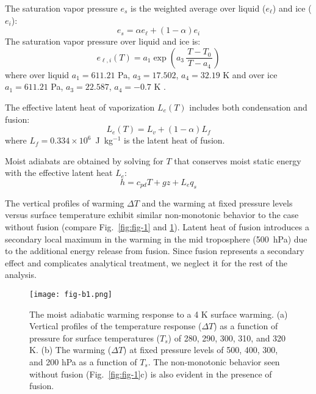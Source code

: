 \documentclass[draft]{ametsocV6.1}
\begin{document}
The saturation vapor pressure $e_s$ is the weighted average over liquid ($e_\ell$) and ice ($e_i$):
\begin{equation}
e_s=\alpha e_{\ell}+(1-\alpha)e_i
\end{equation}
The saturation vapor pressure over liquid and ice is:
\begin{equation}
e_{\ell,i}(T) = a_1 \exp \left( a_3 \,\frac{T - T_0}{\,T - a_4\,} \right)
\label{eq:es_general}
\end{equation}
where over liquid $a_1=611.21$ Pa, $a_3=17.502$, $a_4=32.19$ K \citep{buck1981} and over ice $a_1=611.21$ Pa, $a_3=22.587$, $a_4=-0.7$ K \citep{alduchov1996}.

The effective latent heat of vaporization $L_e(T)$ includes both condensation and fusion:
\begin{equation}
L_e(T) = L_v + (1-\alpha) L_f
\end{equation}
where $L_f = 0.334 \times 10^6$~J~kg$^{-1}$ is the latent heat of fusion.

Moist adiabats are obtained by solving for $T$ that conserves moist static energy with the effective latent heat $L_e$:
\begin{equation}
    h = c_{pd}T + gz + L_e q_s
\end{equation}

The vertical profiles of warming $\Delta T$ and the warming at fixed pressure levels versus surface temperature exhibit similar non-monotonic behavior to the case without fusion (compare Fig.~\ref{fig:fig-1} and \ref{fig:fig-b1}). Latent heat of fusion introduces a secondary local maximum in the warming in the mid troposphere (500~hPa) due to the additional energy release from fusion. Since fusion represents a secondary effect and complicates analytical treatment, we neglect it for the rest of the analysis.

\begin{figure}[htbp]
 \centering
 \texttt{[image: fig-b1.png]}
 \caption{The moist adiabatic warming response to a 4 K surface warming. (a) Vertical profiles of the temperature response ($\Delta T$) as a function of pressure for surface temperatures ($T_s$) of 280, 290, 300, 310, and 320 K. (b) The warming ($\Delta T$) at fixed pressure levels of 500, 400, 300, and 200 hPa as a function of $T_s$. The non-monotonic behavior seen without fusion (Fig.~\ref{fig:fig-1}c) is also evident in the presence of fusion.}\label{fig:fig-b1}
\end{figure}

\clearpage




\end{document}
